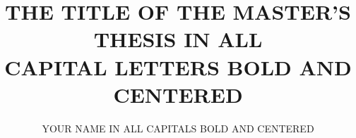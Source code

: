 \documentclass[notes]{buthesis}
\title{THE TITLE OF THE MASTER'S THESIS IN ALL\\
       CAPITAL LETTERS BOLD AND CENTERED}
\author{YOUR NAME IN ALL CAPITALS BOLD AND CENTERED}   %
\begin{document}
\prelims                                  %
\maketitlepage                            %
\makecopyrightpage                        %
\tableofcontents                          %

\mainbody                                 %




\backmatter

\nocite{*}                                %




\end{document}
